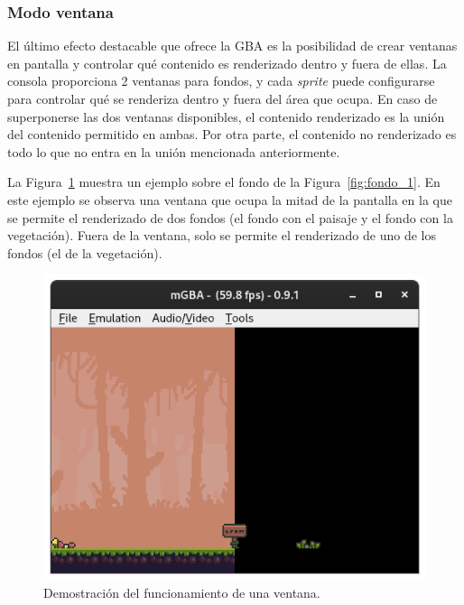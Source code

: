 \subsubsection{Modo ventana}\label{sec:efectos_ventana}
El último efecto destacable que ofrece la GBA es la posibilidad de crear ventanas en pantalla y controlar qué contenido es renderizado dentro y fuera de ellas. La consola proporciona 2 ventanas para fondos, y cada \textit{sprite} puede configurarse para controlar qué se renderiza dentro y fuera del área que ocupa. En caso de superponerse las dos ventanas disponibles, el contenido renderizado es la unión del contenido permitido en ambas. Por otra parte, el contenido no renderizado es todo lo que no entra en la unión mencionada anteriormente.

La Figura~\ref{fig:windows} muestra un ejemplo sobre el fondo de la Figura~\ref{fig:fondo_1}. En este ejemplo se observa una ventana que ocupa la mitad de la pantalla en la que se permite el renderizado de dos fondos (el fondo con el paisaje y el fondo con la vegetación). Fuera de la ventana, solo se permite el renderizado de uno de los fondos (el de la vegetación).

\begin{figure}[b]
	\centering
	\includegraphics[width=.45\textwidth]{capitulos/capitulo3/window_1.png}
	\caption{Demostración del funcionamiento de una ventana.}
	\label{fig:windows}
\end{figure}
